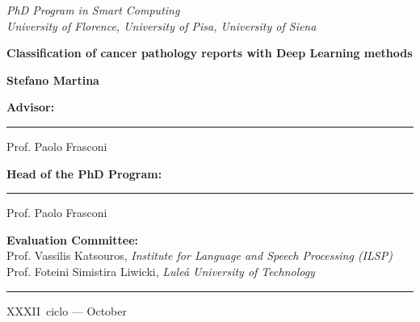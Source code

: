 \documentclass[a4paper,12pt]{memoir}
\def\candidate{Stefano Martina} %
\def\thesistitle{Classification of cancer pathology reports with Deep
  Learning methods} %
\def\advisor{Prof. Paolo Frasconi}
\def\headphdprogram{Prof. Paolo Frasconi}
\def\refereeone{\textnormal{Prof. Vassilis Katsouros}, \textit{Institute for Language and Speech Processing (ILSP)}}
\def\refereetwo{\textnormal{Prof. Foteini Simistira Liwicki}, \textit{Lule{\aa} University of Technology}}
\def\ciclo{XXXII}
\begin{document}
\newpage
{}
{%
  \noindent
  \textit{PhD Program in Smart Computing}\\
  \textit{University of Florence, University of Pisa, University of Siena}

  \vfill
  \noindent
  {\fontsize{32}{38}\selectfont \textbf{\nohyphens{\thesistitle}}\par}
  \vfill
  \noindent
  {\Large \textbf{\candidate}}
}
\vfill
{
  \noindent
  \begin{minipage}{0.4\linewidth}
    \noindent
    {\textbf{Advisor:}}\\
    \vspace{7mm}
    \hrule
    \vspace{2mm}
    \advisor
  \end{minipage}

  \vspace{15mm}
  \noindent
  \begin{minipage}{0.4\linewidth}
    \noindent
    {\textbf{Head of the PhD Program:}}\\
    \vspace{7mm}
    \hrule
    \vspace{2mm}
    \headphdprogram
  \end{minipage}

  \vspace{15mm}

  \noindent
  {\textbf{Evaluation Committee:}}\\
  \refereeone\\
  \refereetwo
}

\begin{center}
  \rule{\linewidth}{0.5mm}
  \ciclo\ ciclo --- October \number\the\year
\end{center}
\thispagestyle{empty}\null\vfil
\end{document}
